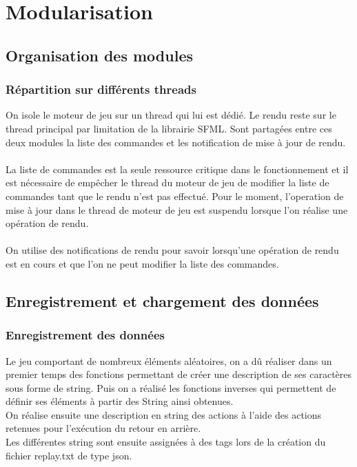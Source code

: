 \chapter{Modularisation}

\section{Organisation des modules}

\subsection{Répartition sur différents threads}

On isole le moteur de jeu sur un thread qui lui est dédié. 
Le rendu reste sur le thread principal par limitation de la
librairie SFML.
Sont partagées entre ces deux modules la liste des commandes et les 
notification de mise à jour de rendu.
\\\\
La liste de commandes est la seule ressource critique dans le 
fonctionnement et il est nécessaire de empêcher le thread du 
moteur de jeu de modifier la liste de commandes tant que le rendu 
n'est pas effectué. Pour le moment, l'operation de mise à jour dans 
le thread de moteur de jeu est suspendu lorsque l'on réalise une 
opération de rendu.
\\\\
On utilise des notifications de rendu pour savoir lorsqu'une 
opération de rendu est en cours et que l'on ne peut modifier la 
liste des commandes.


\section{Enregistrement et chargement des données}

\subsection{Enregistrement des données}
Le jeu comportant de nombreux éléments aléatoires, on a dû 
réaliser dans un premier temps des fonctions permettant de 
créer une description de ses caractères sous forme de 
string. Puis on a réalisé les fonctions inverses qui 
permettent de définir ses éléments à partir des String ainsi 
obtenues.
\\
On réalise ensuite une description en string des actions à 
l'aide des actions retenues pour l'exécution du retour en 
arrière.
\\
Les différentes string sont ensuite assignées à des tags 
lors de la création du fichier replay.txt de type json.

